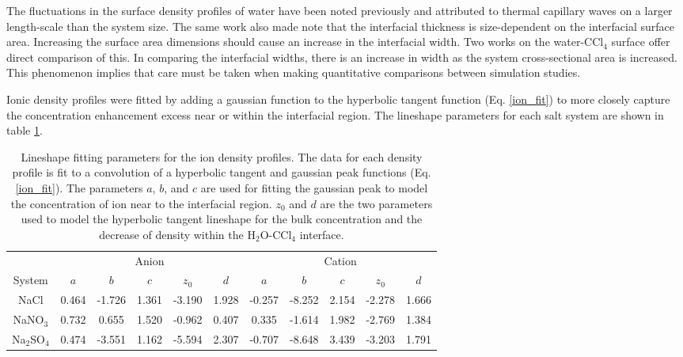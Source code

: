The fluctuations in the surface density profiles of water have been noted previously and attributed to thermal capillary waves on a larger length-scale than the system size.\cite{Chang1996} The same work also made note that the interfacial thickness is size-dependent on the interfacial surface area. Increasing the surface area dimensions should cause an increase in the interfacial width. Two works on the water-CCl$_4$ surface offer direct comparison of this.\cite{Chang1996,Hore2008} In comparing the interfacial widths, there is an increase in width as the system cross-sectional area is increased. This phenomenon implies that care must be taken when making quantitative comparisons between simulation studies.

Ionic density profiles were fitted by adding a gaussian function to the hyperbolic tangent function (Eq. \ref{ion_fit}) to more closely capture the concentration enhancement excess near or within the interfacial region. The lineshape parameters for each salt system are shown in table \ref{ion_params}.

\begin{table}[htdp]
	\begin{center}
	\begin{tabular}{c|c|c|c|c|c|c|c|c|c|c|}
		\cline{2-11}
		\multicolumn{1}{c|}{} & \multicolumn{5}{c}{Anion} & \multicolumn{5}{|c|}{Cation} \\ 
		\cline{1-11}
		\multicolumn{1}{|c|}{System} & $a$ & $b$ & $c$ & $z_0$ & $d$ & $a$ & $b$ & $c$ & $z_0$ & $d$ \\ \hline
		\multicolumn{1}{|c|}{NaCl} & 0.464 & -1.726 & 1.361 & -3.190 & 1.928 & -0.257 & -8.252 & 2.154 & -2.278 & 1.666 \\ \hline
		\multicolumn{1}{|c|}{NaNO$_3$} & 0.732 & 0.655 & 1.520 & -0.962 & 0.407 & 0.335 & -1.614 & 1.982 & -2.769 & 1.384 \\ \hline
		\multicolumn{1}{|c|}{Na$_2$SO$_4$} & 0.474 & -3.551 & 1.162 & -5.594 & 2.307 & -0.707 & -8.648 & 3.439 & -3.203 & 1.791 \\ \hline
	\end{tabular}
	\end{center}
	\caption{Lineshape fitting parameters for the ion density profiles. The data for each density profile is fit to a convolution of a hyperbolic tangent and gaussian peak functions (Eq. \ref{ion_fit}). The parameters $a$, $b$, and $c$ are used for fitting the gaussian peak to model the concentration of ion near to the interfacial region. $z_0$ and $d$ are the two parameters used to model the hyperbolic tangent lineshape for the bulk concentration and the decrease of density within the H$_2$O-CCl$_4$ interface.}
	\label{ion_params}
\end{table}

